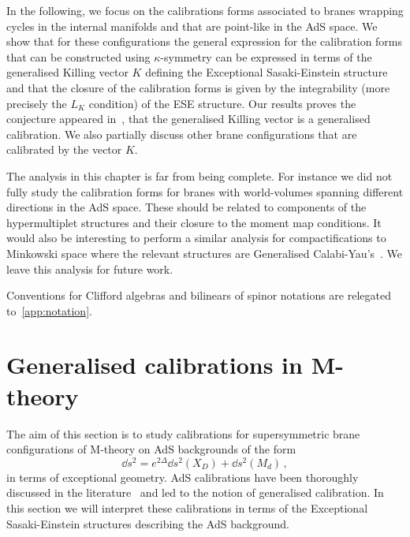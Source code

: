 \documentclass[debug]{phd}
\begin{document}
In the following, we focus on the calibrations forms associated to branes wrapping cycles in the internal manifolds and that are point-like in the AdS space. 
We show that for these configurations the general expression for the calibration forms that can be constructed using $\kappa$-symmetry can be expressed in terms of the generalised Killing vector $K$ defining the Exceptional Sasaki-Einstein structure and that the closure of the calibration forms is given by the integrability (more precisely the $L_K$ condition) of the ESE structure. 
Our results proves the conjecture appeared in~\cite{AshmoreESE}, that the generalised Killing vector is a generalised calibration.
We also partially discuss other brane configurations that are calibrated by the vector $K$.

The analysis in this chapter is far from being complete. 
For instance we did not fully study the calibration forms for branes with world-volumes spanning different directions in the AdS space. 
These should be related to components of the hypermultiplet structures and their closure to the moment map conditions. 
It would also be interesting to perform a similar analysis for compactifications to Minkowski space where the relevant structures are Generalised Calabi-Yau's~\cite{AshmoreECY}. 
We leave this analysis for future work.

Conventions for Clifford algebras and bilinears of spinor notations are relegated to~\cref{app:notation}.

\section{Generalised calibrations in M-theory}
\label{sec:Mcal}
%

The aim of this section is to study calibrations for supersymmetric brane configurations of M-theory on AdS backgrounds of the form
		\begin{equation*}
			\dd s^2 = e^{2 \Delta} \dd s^2(X_D) + \dd s^2(M_d)\, ,
		\end{equation*}		
 in terms of exceptional geometry.
AdS calibrations have been thoroughly discussed in the literature~\cite{Gutowski:1999iu, Gutowski:1999tu, MS03, Koerber:2007jb} and led to the notion of generalised calibration. 
In this section we will interpret these calibrations in terms of the Exceptional Sasaki-Einstein structures describing the AdS background.
\end{document}
